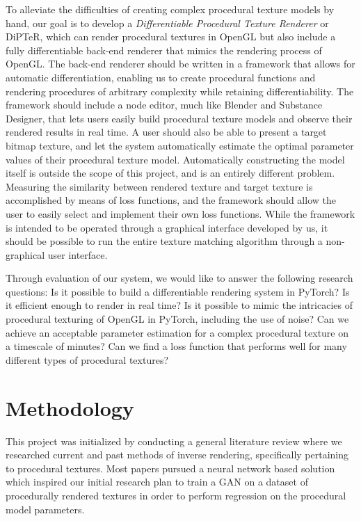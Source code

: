 To alleviate the difficulties of creating complex procedural texture models by hand, our goal is to develop a \textit{Differentiable Procedural Texture Renderer} or DiPTeR, which can render procedural textures in OpenGL but also include a fully differentiable back-end renderer that mimics the rendering process of OpenGL. The back-end renderer should be written in a framework that allows for automatic differentiation, enabling us to create procedural functions and rendering procedures of arbitrary complexity while retaining differentiability. The framework should include a node editor, much like Blender and Substance Designer, that lets users easily build procedural texture models and observe their rendered results in real time. A user should also be able to present a target bitmap texture, and let the system automatically estimate the optimal parameter values of their procedural texture model. Automatically constructing the model itself is outside the scope of this project, and is an entirely different problem. Measuring the similarity between rendered texture and target texture is accomplished by means of loss functions, and the framework should allow the user to easily select and implement their own loss functions. While the framework is intended to be operated through a graphical interface developed by us, it should be possible to run the entire texture matching algorithm through a non-graphical user interface.

Through evaluation of our system, we would like to answer the following research questions: Is it possible to build a differentiable rendering system in PyTorch? Is it efficient enough to render in real time? Is it possible to mimic the intricacies of procedural texturing of OpenGL in PyTorch, including the use of noise? Can we achieve an acceptable parameter estimation for a complex procedural texture on a timescale of minutes? Can we find a loss function that performs well for many different types of procedural textures?

\section{Methodology}

This project was initialized by conducting a general literature review where we researched current and past methods of inverse rendering, specifically pertaining to procedural textures. Most papers pursued a neural network based solution which inspired our initial research plan to train a GAN on a dataset of procedurally rendered textures in order to perform regression on the procedural model parameters.

